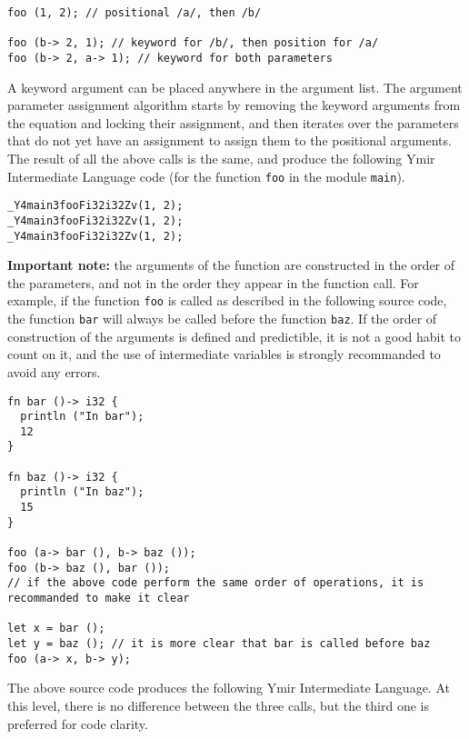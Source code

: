 \begin{lstlisting}[style=coloredverbatim]
foo (1, 2); // positional /a/, then /b/

foo (b-> 2, 1); // keyword for /b/, then position for /a/
foo (b-> 2, a-> 1); // keyword for both parameters
\end{lstlisting}

A keyword argument can be placed anywhere in the argument list. The argument
parameter assignment algorithm starts by removing the keyword arguments from the
equation and locking their assignment, and then iterates over the parameters
that do not yet have an assignment to assign them to the positional arguments.
The result of all the above calls is the same, and produce the following Ymir
Intermediate Language code (for the function \texttt{foo} in the module
\texttt{main}).

\begin{lstlisting}[style=intermediateVerb]
_Y4main3fooFi32i32Zv(1, 2);
_Y4main3fooFi32i32Zv(1, 2);
_Y4main3fooFi32i32Zv(1, 2);
\end{lstlisting}

\textbf{Important note:} the arguments of the function are constructed in the order of
the parameters, and not in the order they appear in the function call. For
example, if the function \texttt{foo} is called as described in the following
source code, the function \texttt{bar} will always be called before the function
\texttt{baz}. If the order of construction of the arguments is defined and
predictible, it is not a good habit to count on it, and the use of intermediate
variables is strongly recommanded to avoid any errors.

\begin{lstlisting}[style=coloredverbatim]
fn bar ()-> i32 {
  println ("In bar");
  12
}

fn baz ()-> i32 {
  println ("In baz");
  15
}

foo (a-> bar (), b-> baz ());
foo (b-> baz (), bar ());
// if the above code perform the same order of operations, it is recommanded to make it clear

let x = bar ();
let y = baz (); // it is more clear that bar is called before baz
foo (a-> x, b-> y);
\end{lstlisting}

The above source code produces the following Ymir Intermediate Language. At this
level, there is no difference between the three calls, but the third one is
preferred for code clarity.

